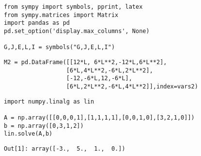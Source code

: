 \documentclass[12pt,fleqn]{article}\usepackage{../../common}
\begin{document}

\begin{verbatim}
from sympy import symbols, pprint, latex
from sympy.matrices import Matrix
import pandas as pd
pd.set_option('display.max_columns', None)

G,J,E,L,I = symbols("G,J,E,L,I")
\end{verbatim}

\begin{verbatim}
M2 = pd.DataFrame([[12*L, 6*L**2,-12*L,6*L**2],
                  [6*L,4*L**2,-6*L,2*L**2],
                  [-12,-6*L,12,-6*L],
                  [6*L,2*L**2,-6*L,4*L**2]],index=vars2)
\end{verbatim}


\begin{verbatim}
import numpy.linalg as lin

A = np.array([[0,0,0,1],[1,1,1,1],[0,0,1,0],[3,2,1,0]])
b = np.array([0,3,1,2])
lin.solve(A,b)
\end{verbatim}

\begin{verbatim}
Out[1]: array([-3.,  5.,  1.,  0.])
\end{verbatim}
\end{document}
